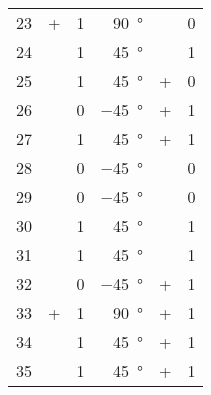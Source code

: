 \begin{longtable}[c]{rccrcc}
	23\hspace{1.5em} &      + & 1 & \qty{ 90}{\degree}\hspace{1.5em} & \times & 0 \\
	24\hspace{1.5em} & \times & 1 & \qty{ 45}{\degree}\hspace{1.5em} & \times & 1 \\
	25\hspace{1.5em} & \times & 1 & \qty{ 45}{\degree}\hspace{1.5em} &      + & 0 \\
	26\hspace{1.5em} & \times & 0 & \qty{-45}{\degree}\hspace{1.5em} &      + & 1 \\
	27\hspace{1.5em} & \times & 1 & \qty{ 45}{\degree}\hspace{1.5em} &      + & 1 \\
	28\hspace{1.5em} & \times & 0 & \qty{-45}{\degree}\hspace{1.5em} & \times & 0 \\
	29\hspace{1.5em} & \times & 0 & \qty{-45}{\degree}\hspace{1.5em} & \times & 0 \\
	30\hspace{1.5em} & \times & 1 & \qty{ 45}{\degree}\hspace{1.5em} & \times & 1 \\
	31\hspace{1.5em} & \times & 1 & \qty{ 45}{\degree}\hspace{1.5em} & \times & 1 \\
	32\hspace{1.5em} & \times & 0 & \qty{-45}{\degree}\hspace{1.5em} &      + & 1 \\
	33\hspace{1.5em} &      + & 1 & \qty{ 90}{\degree}\hspace{1.5em} &      + & 1 \\
	34\hspace{1.5em} & \times & 1 & \qty{ 45}{\degree}\hspace{1.5em} &      + & 1 \\
	35\hspace{1.5em} & \times & 1 & \qty{ 45}{\degree}\hspace{1.5em} &      + & 1 \\

\end{longtable}
